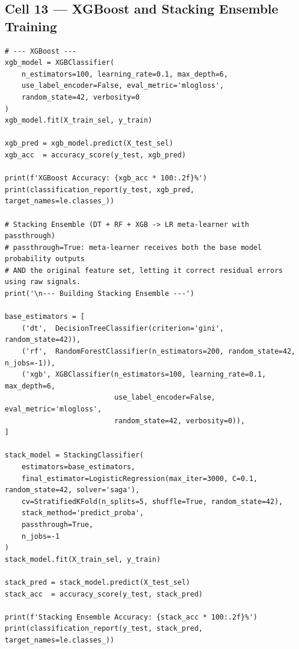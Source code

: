 \documentclass[12pt,a4paper]{article}
\begin{document}
\subsection{Cell 13 --- XGBoost and Stacking Ensemble Training}

\begin{lstlisting}[caption=Cell 13: XGBoost Classifier and Stacking Ensemble]
# --- XGBoost ---
xgb_model = XGBClassifier(
    n_estimators=100, learning_rate=0.1, max_depth=6,
    use_label_encoder=False, eval_metric='mlogloss',
    random_state=42, verbosity=0
)
xgb_model.fit(X_train_sel, y_train)

xgb_pred = xgb_model.predict(X_test_sel)
xgb_acc  = accuracy_score(y_test, xgb_pred)

print(f'XGBoost Accuracy: {xgb_acc * 100:.2f}%')
print(classification_report(y_test, xgb_pred, target_names=le.classes_))

# Stacking Ensemble (DT + RF + XGB -> LR meta-learner with passthrough)
# passthrough=True: meta-learner receives both the base model probability outputs
# AND the original feature set, letting it correct residual errors using raw signals.
print('\n--- Building Stacking Ensemble ---')

base_estimators = [
    ('dt',  DecisionTreeClassifier(criterion='gini', random_state=42)),
    ('rf',  RandomForestClassifier(n_estimators=200, random_state=42, n_jobs=-1)),
    ('xgb', XGBClassifier(n_estimators=100, learning_rate=0.1, max_depth=6,
                          use_label_encoder=False, eval_metric='mlogloss',
                          random_state=42, verbosity=0)),
]

stack_model = StackingClassifier(
    estimators=base_estimators,
    final_estimator=LogisticRegression(max_iter=3000, C=0.1, random_state=42, solver='saga'),
    cv=StratifiedKFold(n_splits=5, shuffle=True, random_state=42),
    stack_method='predict_proba',
    passthrough=True,
    n_jobs=-1
)
stack_model.fit(X_train_sel, y_train)

stack_pred = stack_model.predict(X_test_sel)
stack_acc  = accuracy_score(y_test, stack_pred)

print(f'Stacking Ensemble Accuracy: {stack_acc * 100:.2f}%')
print(classification_report(y_test, stack_pred, target_names=le.classes_))
\end{lstlisting}

\end{document}
